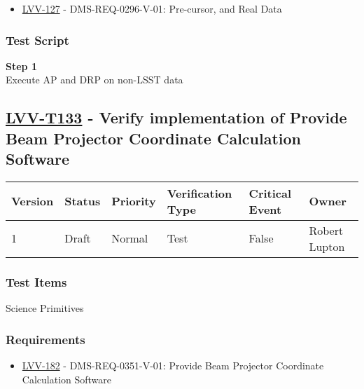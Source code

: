 \begin{itemize}
\tightlist
\item
  \href{https://jira.lsstcorp.org/browse/LVV-127}{LVV-127} -
  DMS-REQ-0296-V-01: Pre-cursor, and Real Data
\end{itemize}

\subsubsection{Test Script}\label{test-script-9}

\textbf{Step 1}\\
Execute AP and DRP on non-LSST data\\[2\baselineskip]

\hypertarget{lvv-t133---verify-implementation-of-provide-beam-projector-coordinate-calculation-software}{\subsection{\texorpdfstring{\href{https://jira.lsstcorp.org/secure/Tests.jspa\#/testCase/LVV-T133}{LVV-T133}
- Verify implementation of Provide Beam Projector Coordinate Calculation
Software}{LVV-T133 - Verify implementation of Provide Beam Projector Coordinate Calculation Software}}\label{lvv-t133---verify-implementation-of-provide-beam-projector-coordinate-calculation-software}}

\begin{longtable}[]{@{}llllll@{}}
\toprule
Version & Status & Priority & Verification Type & Critical Event &
Owner\tabularnewline
\midrule
\endhead
1 & Draft & Normal & Test & False & Robert Lupton\tabularnewline
\bottomrule
\end{longtable}

\subsubsection{Test Items}\label{test-items-10}

Science Primitives~

\subsubsection{Requirements}\label{requirements-10}

\begin{itemize}
\tightlist
\item
  \href{https://jira.lsstcorp.org/browse/LVV-182}{LVV-182} -
  DMS-REQ-0351-V-01: Provide Beam Projector Coordinate Calculation
  Software
\end{itemize}

